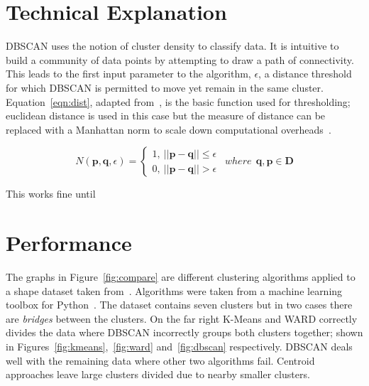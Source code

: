 \documentclass{ecsarticle}     %
\begin{document}
\section{Technical Explanation}

DBSCAN uses the notion of cluster density to classify data.
It is intuitive to build a community of data points by attempting to draw a path of connectivity.
This leads to the first input parameter to the algorithm, $\epsilon$, a distance threshold for which DBSCAN is permitted to move yet remain in the same cluster.
Equation~\eqref{eqn:dist}, adapted from~\cite{ester96dbscan}, is the basic function used for thresholding; euclidean distance is used in this case but the measure of distance can be replaced with a Manhattan norm to scale down computational overheads~\citep{krause86taxicab}.

\newpage
\begin{equation}
	N(\textbf{p},\textbf{q},\epsilon) = \left\{
		\begin{array}{l}
    		1,\: ||\textbf{p} - \textbf{q}|| \leq \epsilon\\
    		0,\: ||\textbf{p} - \textbf{q}|| > \epsilon
  		\end{array} \right.
	\:\:where\:\: \textbf{q},\textbf{p} \in \textbf{D}
	\label{eqn:dist}
\end{equation}

This works fine until
\section{Performance}

The graphs in Figure~\ref{fig:compare} are different clustering algorithms applied to a shape dataset taken from~\cite{gionis05cluster}. 
Algorithms were taken from a machine learning toolbox for Python~\citep{scikit13ml}.
The dataset contains seven clusters but in two cases there are \emph{bridges} between the clusters.
On the far right K-Means and WARD correctly divides the data where DBSCAN incorrectly groups both clusters together; shown in Figures~\ref{fig:kmeans},~\ref{fig:ward} and~\ref{fig:dbscan} respectively.
DBSCAN deals well with the remaining data where other two algorithms fail.
Centroid approaches leave large clusters divided due to nearby smaller clusters.
\end{document}
